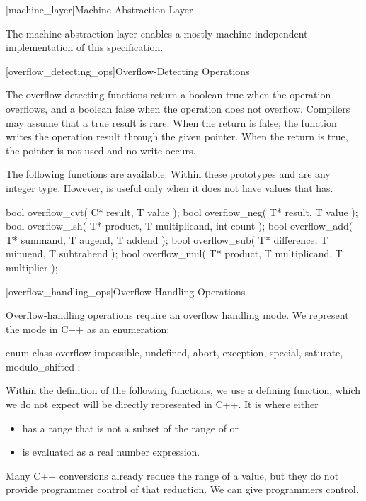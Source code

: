 
[machine_layer]{Machine Abstraction Layer}

The machine abstraction layer enables a mostly machine-independent implementation of this specification.

[overflow_detecting_ops]{Overflow-Detecting Operations}

The overflow-detecting functions return a boolean true when the operation overflows, and a boolean false when the operation does not overflow. Compilers may assume that a true result is rare. When the return is false, the function writes the operation result through the given pointer. When the return is true, the pointer is not used and no write occurs.

The following functions are available. Within these prototypes  and  are any integer type. However,  is useful only when it does not have values that  has.

\begin{codeblock}
bool overflow_cvt( C* result, T value );
bool overflow_neg( T* result, T value );
bool overflow_lsh( T* product, T multiplicand, int count );
bool overflow_add( T* summand, T augend, T addend );
bool overflow_sub( T* difference, T minuend, T subtrahend );
bool overflow_mul( T* product, T multiplicand, T multiplier );
\end{codeblock}

[overflow_handling_ops]{Overflow-Handling Operations}

Overflow-handling operations require an overflow handling mode. We represent the mode in C++ as an enumeration:

\begin{codeblock}
enum class overflow {
	impossible, undefined, abort, exception,
	special,
	saturate, modulo_shifted
};
\end{codeblock}

Within the definition of the following functions, we use a defining function, which we do not expect will be directly represented in C++. It is  where  either
\begin{itemize}
\item has a range that is not a subset of the range of  or
\item is evaluated as a real number expression.
\end{itemize}

Many C++ conversions already reduce the range of a value, but they do not provide programmer control of that reduction. We can give programmers control.

